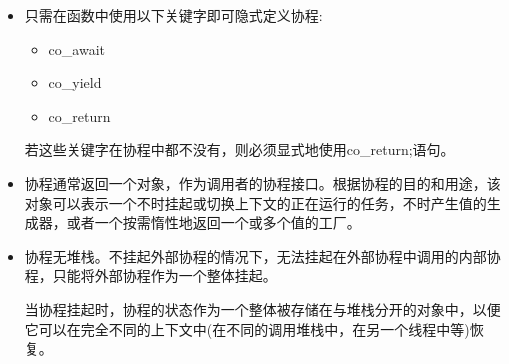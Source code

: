 \begin{itemize}
\item
只需在函数中使用以下关键字即可隐式定义协程:

\begin{itemize}
\item
co\_await

\item
co\_yield

\item
co\_return
\end{itemize}

若这些关键字在协程中都不没有，则必须显式地使用co\_return;语句。

\item
协程通常返回一个对象，作为调用者的协程接口。根据协程的目的和用途，该对象可以表示一个不时挂起或切换上下文的正在运行的任务，不时产生值的生成器，或者一个按需惰性地返回一个或多个值的工厂。

\item
协程无堆栈。不挂起外部协程的情况下，无法挂起在外部协程中调用的内部协程，只能将外部协程作为一个整体挂起。

当协程挂起时，协程的状态作为一个整体被存储在与堆栈分开的对象中，以便它可以在完全不同的上下文中(在不同的调用堆栈中，在另一个线程中等)恢复。
\end{itemize}












